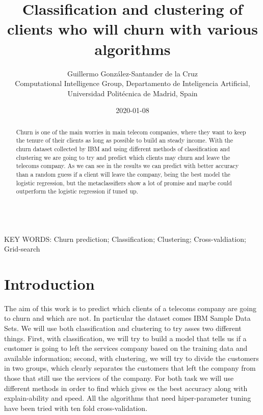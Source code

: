 \documentclass[a4paper,11pt]{article}
\begin{document}
\title{Classification and clustering of clients who will churn with various algorithms}

\author{{Guillermo González-Santander de la Cruz}\\
{\small Computational Intelligence Group, Departamento de Inteligencia Artificial, Universidad Politécnica de Madrid, Spain}}

\date{2020-01-08}
\maketitle



\begin{abstract}
Churn is one of the main worries in main telecom companies, where they want to keep the tenure of their clients as long as possible to build an steady income. With the churn dataset collected by IBM and using different methods of classification and clustering we are going to try and predict which clients may churn and leave the telecoms company.
As we can see in the results we can predict with better accuracy than a random guess if a client will leave the company, being the best model the logistic regression, but the metaclassifiers show a lot of promise and maybe could outperform the logistic regression if tuned up.
\end{abstract}


\ \\
KEY WORDS: Churn prediction; Classification; Clustering; Cross-valdiation; Grid-search

\section{Introduction}

The aim of this work is to predict which clients of a telecoms company are going to churn and which are not. In particular the dataset comes IBM Sample Data Sets.
We will use both classification and clustering to try asses two different things. First, with classification, we will try to build a model that tells us if a customer is going to left the services company based on the training data and available information; second, with clustering, we will try to divide the customers in two groups, which clearly separates the customers that left the company from those that still use the services of the company.
For both task we will use different methods in order to find which gives es the best accuracy along with explain-ability and speed.
All the algorithms that need hiper-parameter tuning have been tried with ten fold cross-validation.
\end{document}
